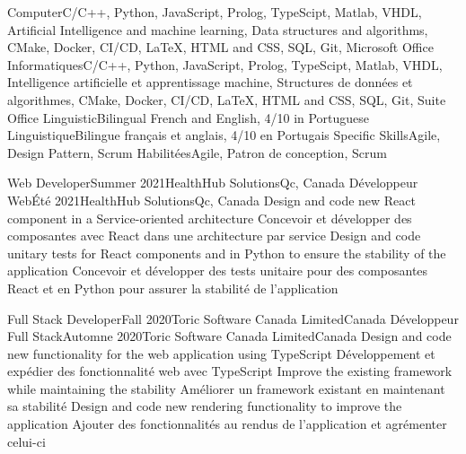     \resumeEnumerationStart
        \resumeEnumerationEnFr
            {Computer}{C/C++, Python, JavaScript, Prolog, TypeScipt, Matlab, VHDL, Artificial Intelligence and machine learning, Data structures and algorithms, CMake, Docker, CI/CD, LaTeX, HTML and CSS, SQL, Git, Microsoft Office}
            {Informatiques}{C/C++, Python, JavaScript, Prolog, TypeScipt, Matlab, VHDL, Intelligence artificielle et apprentissage machine, Structures de données et algorithmes, CMake, Docker, CI/CD, LaTeX, HTML and CSS, SQL, Git, Suite Office}
        \resumeEnumerationEnFr
            {Linguistic}{Bilingual French and English, 4/10 in Portuguese}
            {Linguistique}{Bilingue français et anglais, 4/10 en Portugais}
        \resumeEnumerationEnFr
            {Specific Skills}{Agile, Design Pattern, Scrum}
            {Habilitées}{Agile, Patron de conception, Scrum}
    \resumeEnumerationEnd


  \resumeSubHeadingListStart
    \resumeSubheadingEnFr
        {Web Developer}{Summer 2021}{HealthHub Solutions}{Qc, Canada}
        {Développeur Web}{Été 2021}{HealthHub Solutions}{Qc, Canada}
            \resumeItemListStart
                \resumeItemEnFr
                    {Design and code new React component in a Service-oriented architecture}
                    {Concevoir et développer des composantes avec React dans une architecture par service}
                \resumeItemEnFr
                    {Design and code unitary tests for React components and in Python to ensure the stability of the application}
                    {Concevoir et développer des tests unitaire pour des composantes React et en Python pour assurer la stabilité de l’application}
            \resumeItemListEnd

    \resumeSubheadingEnFr
        {Full Stack Developer}{Fall 2020}{Toric Software Canada Limited}{Canada}
        {Développeur Full Stack}{Automne 2020}{Toric Software Canada Limited}{Canada}
            \resumeItemListStart
                \resumeItemEnFr
                    {Design and code new functionality for the web application using TypeScript}
                    {Développement et expédier des fonctionnalité web avec TypeScript}
                \resumeItemEnFr
                    {Improve the existing framework while maintaining the stability}
                    {Améliorer un framework existant en maintenant sa stabilité}
                \resumeItemEnFr
                    {Design and code new rendering functionality to improve the application}
                    {Ajouter des fonctionnalités au rendus de l’application et agrémenter celui-ci}
            \resumeItemListEnd
        
